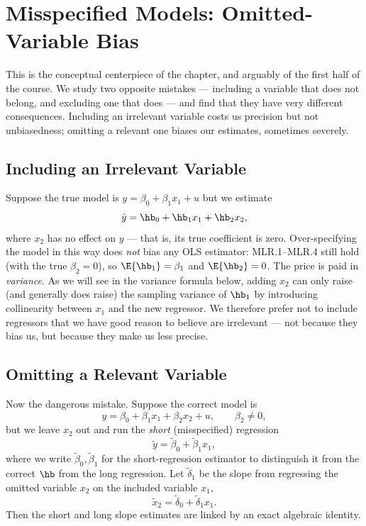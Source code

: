 \section{Misspecified Models: Omitted-Variable Bias}

This is the conceptual centerpiece of the chapter, and arguably of the first half of the course. We study two opposite mistakes --- including a variable that does not belong, and excluding one that does --- and find that they have very different consequences. Including an irrelevant variable costs us precision but not unbiasedness; omitting a relevant one biases our estimates, sometimes severely.

\subsection{Including an Irrelevant Variable}

Suppose the true model is $y = \beta_0 + \beta_1 x_1 + u$ but we estimate
\[
\hat y = \hb_0 + \hb_1 x_1 + \hb_2 x_2,
\]
where $x_2$ has no effect on $y$ --- that is, its true coefficient is zero. Over-specifying the model in this way does \emph{not} bias any OLS estimator: MLR.1--MLR.4 still hold (with the true $\beta_2 = 0$), so $\E{\hb_1}=\beta_1$ and $\E{\hb_2}=0$. The price is paid in \emph{variance}. As we will see in the variance formula below, adding $x_2$ can only raise (and generally does raise) the sampling variance of $\hb_1$ by introducing collinearity between $x_1$ and the new regressor. We therefore prefer not to include regressors that we have good reason to believe are irrelevant --- not because they bias us, but because they make us less precise.

\subsection{Omitting a Relevant Variable}

Now the dangerous mistake. Suppose the correct model is
\[
y = \beta_0 + \beta_1 x_1 + \beta_2 x_2 + u, \qquad \beta_2 \ne 0,
\]
but we leave $x_2$ out and run the \emph{short} (misspecified) regression
\[
\tilde y = \tilde\beta_0 + \tilde\beta_1 x_1,
\]
where we write $\tilde\beta_0,\tilde\beta_1$ for the short-regression estimator to distinguish it from the correct $\hb$ from the long regression. Let $\tilde\delta_1$ be the slope from regressing the omitted variable $x_2$ on the included variable $x_1$,
\[
\tilde x_2 = \tilde\delta_0 + \tilde\delta_1 x_1.
\]
Then the short and long slope estimates are linked by an exact algebraic identity.

